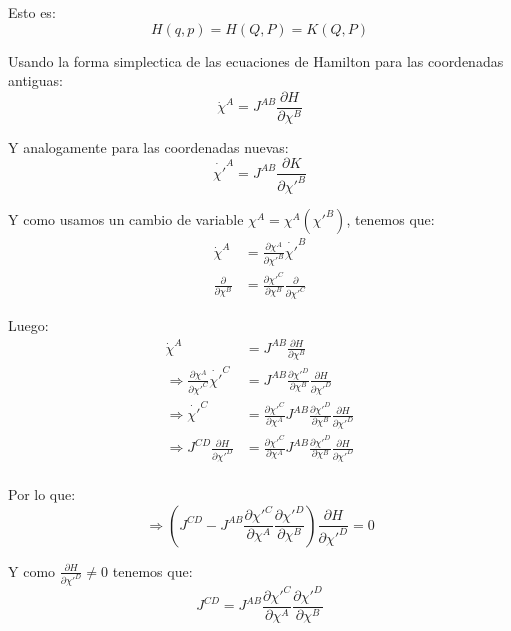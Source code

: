 \documentclass[paper=a4, fontsize=11pt,twoside]{scrartcl}
\begin{document}
Esto es:
	\begin{equation*}
		H(q,p) = H(Q,P) = K(Q,P)
	\end{equation*}

Usando la forma simplectica de las ecuaciones de Hamilton para las coordenadas antiguas:
	\begin{equation*}
		\dot{\chi}^{A} = J^{AB}\frac{\partial H}{\partial \chi^{B}}
	\end{equation*}

Y analogamente para las coordenadas nuevas:
	\begin{equation*}
		\dot{\chi'}^{A} = J^{AB}\frac{\partial K}{\partial \chi'^{B}}
	\end{equation*}
	
Y como usamos un cambio de variable $ \chi^{A} = \chi^{A} (\chi'^{B}) $, tenemos que:
	\begin{align*}
		\dot{\chi}^{A} &= \frac{\partial \chi^{A}}{\partial \chi'^{B}} \dot{\chi'}^{B} \\
		\frac{\partial }{\partial \chi^{B}} &= \frac{\partial \chi'^{C}}{\partial \chi^{B}} \frac{\partial }{\partial \chi'^{C}}
	\end{align*}
	
Luego:
	\begin{align*}
		\dot{\chi}^{A} &= J^{AB}\frac{\partial H}{\partial \chi^{B}}  \\
\Rightarrow \frac{\partial \chi^{A}}{\partial \chi'^{C}} \dot{\chi'}^{C} &= 
             J^{AB}\frac{\partial \chi'^{D}}{\partial \chi^{B}} \frac{\partial H}{\partial \chi'^{D}} \\
\Rightarrow  \dot{\chi'}^{C} &=  
             \frac{\partial \chi'^{C}}{\partial \chi^{A}}J^{AB}\frac{\partial \chi'^{D}}{\partial \chi^{B}} \frac{\partial H}{\partial \chi'^{D}} \\   
\Rightarrow J^{CD}\frac{\partial H}{\partial \chi'^{D}} &=  
             \frac{\partial \chi'^{C}}{\partial \chi^{A}}J^{AB}\frac{\partial \chi'^{D}}{\partial \chi^{B}} \frac{\partial H}{\partial \chi'^{D}} \\   
	\end{align*}
	
Por lo que:
	\begin{equation*}
\Rightarrow \left(J^{CD} - J^{AB}\frac{\partial \chi'^{C}}{\partial \chi^{A}}\frac{\partial \chi'^{D}}{\partial \chi^{B}}\right)\frac{\partial H}{\partial \chi'^{D}} = 0
	\end{equation*}

Y como $\frac{\partial H}{\partial \chi'^{D}}  \neq 0$ tenemos que:
	\begin{equation*}
		J^{CD} = J^{AB}\frac{\partial \chi'^{C}}{\partial \chi^{A}}\frac{\partial \chi'^{D}}{\partial \chi^{B}} 
	\end{equation*}
\end{document}
